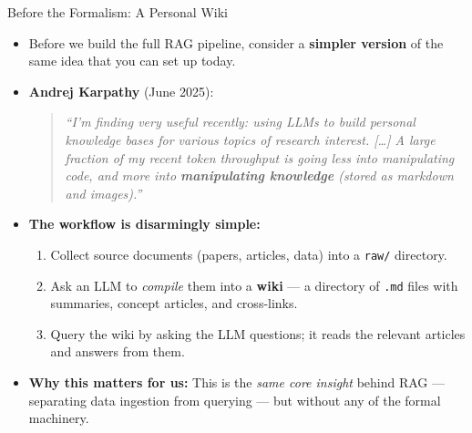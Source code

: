 \begin{frame}{Before the Formalism: A Personal Wiki}
\begin{itemize}
\item Before we build the full RAG pipeline, consider a \textbf{simpler version} of the same idea that you can set up today.

\medskip
\item \textbf{Andrej Karpathy} (June 2025):
\begin{quote}
\small\itshape
``I'm finding very useful recently: using LLMs to build personal knowledge bases for various topics of research interest. \textnormal{[\ldots]} A large fraction of my recent token throughput is going less into manipulating code, and more into \textbf{manipulating knowledge} (stored as markdown and images).''
\end{quote}

\medskip
\item \textbf{The workflow is disarmingly simple:}
\begin{enumerate}
    \item Collect source documents (papers, articles, data) into a \texttt{raw/} directory.
    \item Ask an LLM to \emph{compile} them into a \textbf{wiki} --- a directory of \texttt{.md} files with summaries, concept articles, and cross-links.
    \item Query the wiki by asking the LLM questions; it reads the relevant articles and answers from them.
\end{enumerate}

\medskip
\item \textbf{Why this matters for us:} This is the \emph{same core insight} behind RAG --- separating data ingestion from querying --- but without any of the formal machinery.
\end{itemize}
\end{frame}

